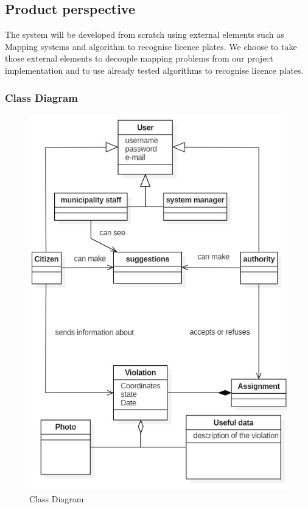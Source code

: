 \subsection{Product perspective}
The system will be developed from scratch using external elements such as Mapping systems and algorithm to recognise licence plates. We choose to take those external elements to decouple mapping problems from our project implementation and to use already tested algorithms to recognise licence plates.

\subsubsection{Class Diagram}
\begin{figure}[h]
\centering
\includegraphics{Images/classdiagram.png}
\caption{\label{fig:cs} Class Diagram}
\end{figure}
\newpage
